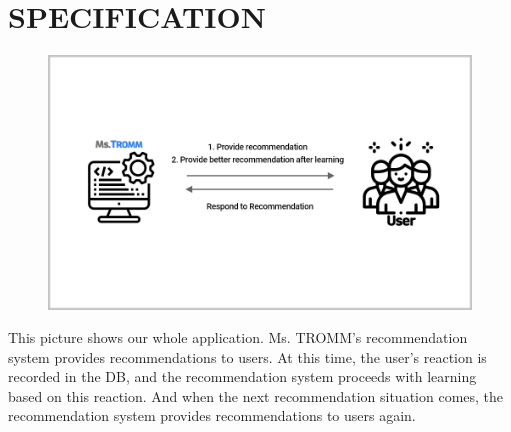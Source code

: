 \documentclass[conference]{IEEEtran}
\begin{document}
\section{SPECIFICATION}
    \begin{figure}[htbp]
\centerline{\includegraphics[scale=0.2]{assets/Whole application.jpg}}
\label{fig}
\end{figure}
This picture shows our whole application. Ms. TROMM's recommendation system provides recommendations to users. At this time, the user's reaction is recorded in the DB, and the recommendation system proceeds with learning based on this reaction. And when the next recommendation situation comes, the recommendation system provides recommendations to users again. \\ \\ \\ \\ 
\end{document}
